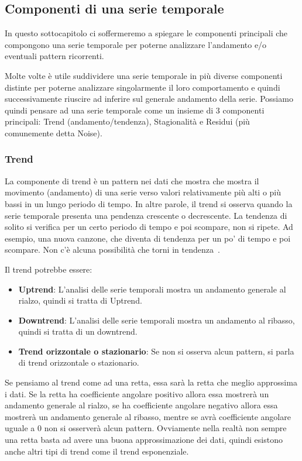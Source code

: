 \subsection{Componenti di una serie temporale}
In questo sottocapitolo ci soffermeremo a spiegare le componenti principali
che compongono una serie temporale per poterne analizzare l'andamento e/o
eventuali pattern ricorrenti.


Molte volte è utile suddividere una serie temporale in più diverse componenti
distinte per poterne analizzare singolarmente il loro comportamento e quindi successivamente
riuscire ad inferire sul generale andamento della serie. Possiamo quindi
pensare ad una serie temporale come un insieme di 3 componenti principali:
Trend (andamento/tendenza), Stagionalità e Residui (più comunemente detta Noise).

\subsubsection{Trend}
La componente di trend è un pattern nei dati che mostra che mostra il 
movimento (andamento) di una serie verso valori relativamente più alti o più bassi 
in un lungo periodo di tempo. In altre parole, il trend si osserva quando 
la serie temporale presenta una pendenza crescente o decrescente. 
La tendenza di solito si verifica per un certo periodo di tempo 
e poi scompare, non si ripete. Ad esempio, una nuova canzone, 
che diventa di tendenza per un po' di tempo e poi scompare. 
Non c'è alcuna possibilità che torni in tendenza~\cite{gg:trend}.


Il trend potrebbe essere:
\begin{itemize}
    \setlength\itemsep{-0.6em}
    \item \textbf{Uptrend}: L'analisi delle serie temporali mostra un andamento generale al rialzo, quindi si tratta di Uptrend.
    \item \textbf{Downtrend}: L'analisi delle serie temporali mostra un andamento al ribasso, quindi si tratta di un downtrend.
    \item \textbf{Trend orizzontale o stazionario}: Se non si osserva alcun pattern, si parla di trend orizzontale o stazionario.
\end{itemize}

Se pensiamo al trend come ad una retta, essa sarà la retta che meglio approssima i dati. Se 
la retta ha coefficiente angolare positivo allora essa mostrerà un andamento generale al rialzo,
se ha coefficiente angolare negativo allora essa mostrerà un andamento generale al ribasso, mentre se
avrà coefficiente angolare uguale a $0$ non si osserverà alcun pattern.
Ovviamente nella realtà non sempre una retta basta ad avere una buona approssimazione dei dati, quindi
esistono anche altri tipi di trend come il trend esponenziale.


